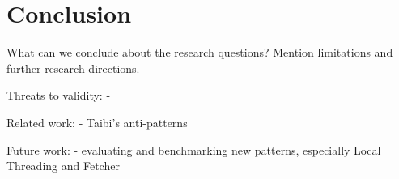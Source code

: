 \chapter{Conclusion}

What can we conclude about the research questions? Mention limitations and further research directions.

Threats to validity:
-

Related work:
- Taibi's anti-patterns

Future work:
- evaluating and benchmarking new patterns, especially Local Threading and Fetcher

